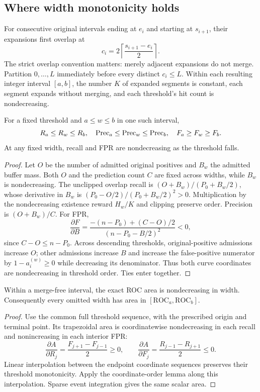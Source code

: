 \subsection{Where width monotonicity holds}
For consecutive original intervals ending at $e_i$ and starting at $s_{i+1}$,
their expansions first overlap at
\[
 c_i=2\left\lceil\frac{s_{i+1}-e_i}{2}\right\rceil .
\]
The strict overlap convention matters: merely adjacent expansions do not merge.
Partition $0,\allowbreak \ldots,\allowbreak L$ immediately before every distinct $c_i\le L$.
Within each resulting integer interval $[a,\allowbreak b]$, the number $K$ of expanded
segments is constant, each segment expands without merging, and each
threshold's hit count is nondecreasing.

\begin{lemma}
For a fixed threshold and $a\le w\le b$ in one such interval,
\[
 R_a\le R_w\le R_b,\quad
 \mathrm{Prec}_a\le\mathrm{Prec}_w\le\mathrm{Prec}_b,\quad
 F_a\ge F_w\ge F_b .
\]
At any fixed width, recall and FPR are nondecreasing as the threshold falls.
\end{lemma}
\begin{proof}
Let $O$ be the number of admitted original positives and $B_w$ the admitted
buffer mass. Both $O$ and the prediction count $C$ are fixed across widths,
while $B_w$ is nondecreasing. The unclipped overlap recall is
$(O+B_w)/(P_0+B_w/2)$, whose derivative in $B_w$ is
$(P_0-O/2)/(P_0+B_w/2)^2>0$. Multiplication by the nondecreasing
existence reward $H_w/K$ and clipping preserve order.
Precision is $(O+B_w)/C$. For FPR,
\[
 \frac{\partial F}{\partial B}
 =\frac{-(n-P_0)+(C-O)/2}{(n-P_0-B/2)^2}<0,
\]
since $C-O\le n-P_0$.
Across descending thresholds, original-positive admissions increase $O$;
other admissions increase $B$ and increase the false-positive numerator by
$1-a_i^{(w)}\ge0$ while decreasing its denominator. Thus both curve
coordinates are nondecreasing in threshold order. Ties enter together.
\end{proof}

\begin{theorem}
Within a merge-free interval, the exact ROC area is nondecreasing in width.
Consequently every omitted width has area in
$[\mathrm{ROC}_a,\allowbreak \mathrm{ROC}_b]$.
\end{theorem}
\begin{proof}
Use the common full threshold sequence, with the prescribed origin and
terminal point. Its trapezoidal area is coordinatewise nondecreasing in each
recall and nonincreasing in each interior FPR:
\[
 \frac{\partial A}{\partial R_j}=\frac{F_{j+1}-F_{j-1}}2\ge0,\qquad
 \frac{\partial A}{\partial F_j}=\frac{R_{j-1}-R_{j+1}}2\le0 .
\]
Linear interpolation between the endpoint coordinate sequences preserves
their threshold monotonicity. Apply the coordinate-order lemma along this
interpolation. Sparse event integration gives the same scalar area.
\end{proof}

